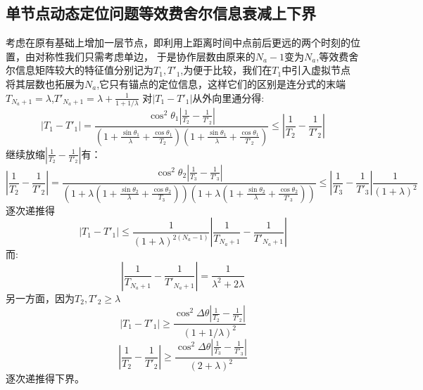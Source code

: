 \subsection{单节点动态定位问题等效费舍尔信息衰减上下界}\label{B_F_2}
考虑在原有基础上增加一层节点，即利用上距离时间中点前后更远的两个时刻的位置，由对称性我们只需考虑单边，
于是协作层数由原来的$N_a-1$变为$N_a$,等效费舍尔信息矩阵较大的特征值分别记为$T_1,T'_1$,为便于比较，我们在$T_1$中引入虚拟节点将其层数也拓展为$N_a$,它只有锚点的定位信息，这样它们的区别是连分式的末端$T_{N_a+1}=\lambda$,$T'_{N_a+1}=\lambda+\frac{1}{1+1/\lambda}$
对$|T_1-T'_1|$从外向里通分得:
\[
|T_1-T'_1|=\frac{\cos^2\theta_1|\frac{1}{T_2}-\frac{1}{T'_2}|}{(1+\frac{\sin\theta_1}{\lambda}+\frac{\cos\theta_1}{T_2})
(1+\frac{\sin\theta_1}{\lambda}+\frac{\cos\theta_1}{T'_2})}\leq |\frac{1}{T_2}-\frac{1}{T'_2}|
\]
继续放缩$|\frac{1}{T_2}-\frac{1}{T'_2}|$有：
\[
|\frac{1}{T_2}-\frac{1}{T'_2}|= \frac{\cos^2\theta_2|\frac{1}{T_3}-\frac{1}{T'_3}|}{(1+\lambda(1+\frac{\sin\theta_2}{\lambda}+\frac{\cos\theta_2}{T_3}))
(1+\lambda(1+\frac{\sin\theta_2}{\lambda}+\frac{\cos\theta_2}{T'_3}))}\leq |\frac{1}{T_3}-\frac{1}{T'_3}|\frac{1}{(1+\lambda)^2}
\]
逐次递推得
\[
|T_1-T'_1|\leq \frac{1}{(1+\lambda)^{2(N_a-1)}} |\frac{1}{T_{N_a+1}}-\frac{1}{T'_{N_a+1}}|
\]
而:
\[
|\frac{1}{T_{N_a+1}}-\frac{1}{T'_{N_a+1}}|=\frac{1}{\lambda^2+2\lambda}
\]
另一方面，因为$T_2,T'_2\geq \lambda$
\[
|T_1-T'_1|\geq \frac{\cos^2\Delta\theta|\frac{1}{T_2}-\frac{1}{T'_2}|}{(1+1/\lambda)^2}
\]
\[
|\frac{1}{T_2}-\frac{1}{T'_2}|\geq \frac{\cos^2\Delta\theta|\frac{1}{T_3}-\frac{1}{T'_3}|}{(2+\lambda)^2}
\]
逐次递推得下界。
